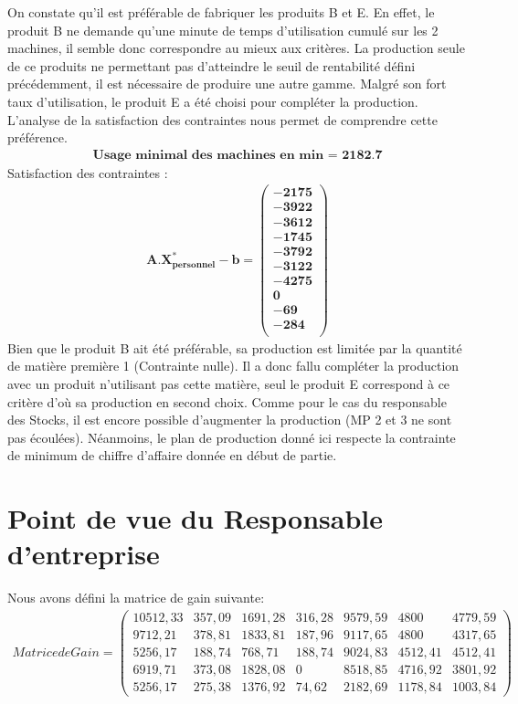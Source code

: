 \documentclass[12pt]{article}
\begin{document}
On constate qu'il est préférable de fabriquer les produits B et E. En effet, le produit B ne demande qu'une minute de temps d'utilisation cumulé sur les 2 machines, il semble donc correspondre au mieux aux critères. La production seule de ce produits ne permettant pas d'atteindre le seuil de rentabilité défini précédemment, il est nécessaire de produire une autre gamme. Malgré son fort taux d'utilisation, le produit E a été choisi pour compléter la production. L'analyse de la satisfaction des contraintes nous permet de comprendre cette préférence.
\begin{align*}
\textbf{Usage minimal des machines en min = 2182.7}
\end{align*}
Satisfaction des contraintes : 
\begin{align*}
\boldsymbol{A.X^{*}_{personnel} - b = 
   \left (
   \begin{aligned}
      -2175 \\
      -3922 \\
      -3612 \\
      -1745 \\
      -3792 \\
      -3122 \\
      -4275 \\
      0 \\
      -69 \\
      -284\\
   \end{aligned}
   \right )
 } 
\end{align*}
Bien que le produit B ait été préférable, sa production est limitée par la quantité de matière première 1 (Contrainte nulle). Il a donc fallu compléter la production avec un produit n'utilisant pas cette matière, seul le produit E correspond à ce critère d'où sa production en second choix.
Comme pour le cas du responsable des Stocks, il est encore possible d'augmenter la production (MP 2 et 3 ne sont pas écoulées). Néanmoins, le plan de production donné ici respecte la contrainte de minimum de chiffre d'affaire donnée en début de partie.
\section{Point de vue du Responsable d'entreprise}
Nous avons défini la matrice de gain suivante:
\begin{align*}
Matrice de Gain =
 \begin{pmatrix}
  10512,33	&357,09	&1691,28 &316,28& 9579,59 &4800 &4779,59\\
9712,21	&378,81	&1833,81	&187,96	&9117,65	&4800	&4317,65\\
5256,17	&188,74	&768,71	&188,74	&9024,83	&4512,41	&4512,41\\
6919,71	&373,08	&1828,08	&0	&8518,85	&4716,92	&3801,92\\
5256,17	&275,38	&1376,92 &74,62	&2182,69   &1178,84 &1003,84
 \end{pmatrix}
\end{align*}\\
\end{document}
